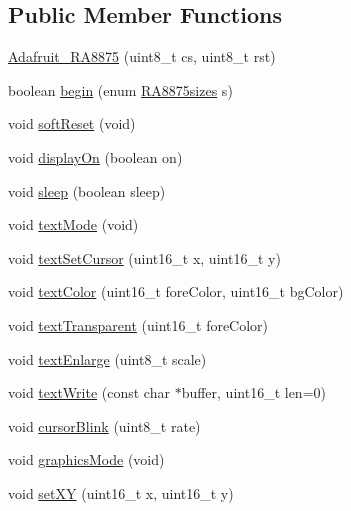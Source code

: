 \subsection*{Public Member Functions}
\begin{DoxyCompactItemize}
\item 
\mbox{\hyperlink{class_adafruit___r_a8875_ad2ebbbb158479ad96d793cdc84e29a62}{Adafruit\+\_\+\+R\+A8875}} (uint8\+\_\+t cs, uint8\+\_\+t rst)
\item 
boolean \mbox{\hyperlink{class_adafruit___r_a8875_a7effb4b2bb86a9d8b695d089706c001c}{begin}} (enum \mbox{\hyperlink{_adafruit___r_a8875_8h_aadfa25dab72d848e1d3c1562fec77a0c}{R\+A8875sizes}} s)
\item 
void \mbox{\hyperlink{class_adafruit___r_a8875_ab80403cb248d78d78aae92ad5e40166c}{soft\+Reset}} (void)
\item 
void \mbox{\hyperlink{class_adafruit___r_a8875_ac8b6193126c329a2e45e9f962dc4b30e}{display\+On}} (boolean on)
\item 
void \mbox{\hyperlink{class_adafruit___r_a8875_a20b6b7c127c9247918ac745c002adaba}{sleep}} (boolean sleep)
\item 
void \mbox{\hyperlink{class_adafruit___r_a8875_a4213dbf041641172b7bac40e3b451da5}{text\+Mode}} (void)
\item 
void \mbox{\hyperlink{class_adafruit___r_a8875_a9bf7b027ee1a23f514d16995171dd027}{text\+Set\+Cursor}} (uint16\+\_\+t x, uint16\+\_\+t y)
\item 
void \mbox{\hyperlink{class_adafruit___r_a8875_ac1e58c35a5179a7590507c0ac132da74}{text\+Color}} (uint16\+\_\+t fore\+Color, uint16\+\_\+t bg\+Color)
\item 
void \mbox{\hyperlink{class_adafruit___r_a8875_adcb9cc6b7e2b4d03a32a5fc87e033164}{text\+Transparent}} (uint16\+\_\+t fore\+Color)
\item 
void \mbox{\hyperlink{class_adafruit___r_a8875_a960a7ed5b834a0d058059cbc15412387}{text\+Enlarge}} (uint8\+\_\+t scale)
\item 
void \mbox{\hyperlink{class_adafruit___r_a8875_af2b427d3d6e429aeccbeb956c4159456}{text\+Write}} (const char $\ast$buffer, uint16\+\_\+t len=0)
\item 
void \mbox{\hyperlink{class_adafruit___r_a8875_a7dc51babe54f65192d1b38d30a8d1b74}{cursor\+Blink}} (uint8\+\_\+t rate)
\item 
void \mbox{\hyperlink{class_adafruit___r_a8875_a214eb74511139c5a0cdb62b051655f8a}{graphics\+Mode}} (void)
\item 
void \mbox{\hyperlink{class_adafruit___r_a8875_a807ac7af98da8800090badbc7ef8c333}{set\+XY}} (uint16\+\_\+t x, uint16\+\_\+t y)

\end{DoxyCompactItemize}
